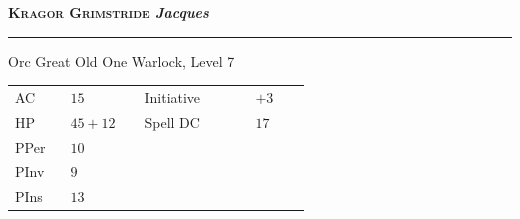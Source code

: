 \documentclass{article}
\newcommand{\h}[1]{\textcolor{headercolor}{#1}}
\begin{document}
\pagestyle{empty}
\vspace*{0.5\textheight}
\Large\textbf{\textcolor{headercolor}{\scshape Kragor Grimstride} \hfill \textit{Jacques}}

\rule{\linewidth}{0.4pt}

Orc Great Old One Warlock, Level 7

\vspace{1em}
\begin{tabular}{%
        >{\raggedleft\arraybackslash}p{0.15\linewidth} |%
        p{0.20\linewidth}%
        >{\raggedleft\arraybackslash}p{0.30\linewidth} |%
        p{0.15\linewidth}}%
\h{AC}   & $15$      & \h{Initiative} & $+3$ \\
\h{HP}   & $45 + 12$ & \h{Spell DC}   & $17$ \\
\h{PPer} & $10$      & & \\
\h{PInv} & $9$       & & \\
\h{PIns} & $13$      & &
\end{tabular}
\end{document}
